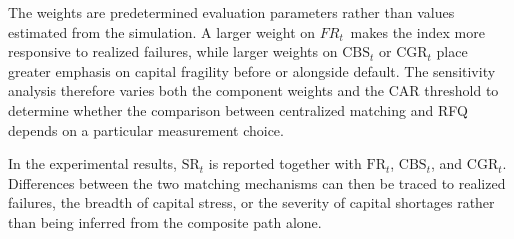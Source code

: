 The weights are predetermined evaluation parameters rather than values
estimated from the simulation. A larger weight on \({FR}_{t\ }\) makes
the index more responsive to realized failures, while larger weights on
\(\mathrm{CBS}_t\) or \(\mathrm{CGR}_t\) place greater emphasis on capital fragility
before or alongside default. The sensitivity analysis therefore varies
both the component weights and the CAR threshold to determine whether
the comparison between centralized matching and RFQ depends on a
particular measurement choice.

In the experimental results, \(\mathrm{SR}_t\) is reported together with
\(\mathrm{FR}_t\), \(\mathrm{CBS}_t\), and \(\mathrm{CGR}_t\). Differences between the
two matching mechanisms can then be traced to realized failures, the
breadth of capital stress, or the severity of capital shortages rather
than being inferred from the composite path alone.
